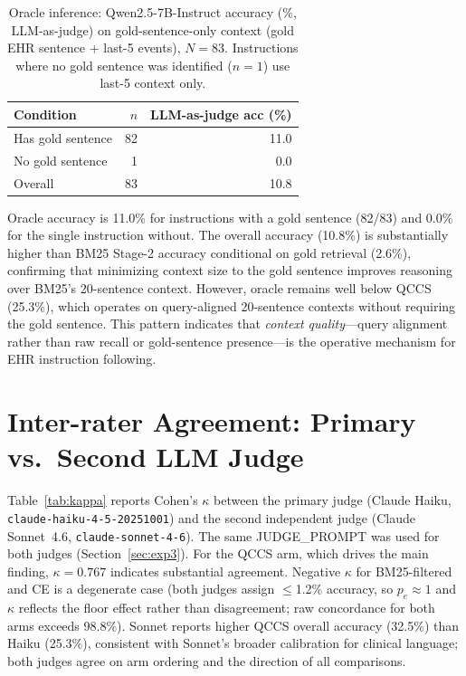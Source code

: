 \documentclass{article}
\begin{document}
\begin{table}[H]
\centering
\caption{Oracle inference: Qwen2.5-7B-Instruct accuracy (\%, LLM-as-judge)
  on gold-sentence-only context (gold EHR sentence + last-5 events), $N{=}83$.
  Instructions where no gold sentence was identified ($n{=}1$) use
  last-5 context only.}
\label{tab:oracle}
\small
\begin{tabular}{@{}lrr@{}}
\toprule
Condition & $n$ & LLM-as-judge acc (\%) \\
\midrule
Has gold sentence & 82 & 11.0 \\
No gold sentence  &  1 &  0.0 \\
Overall           & 83 & 10.8 \\
\bottomrule
\end{tabular}
\end{table}

Oracle accuracy is 11.0\% for instructions with a gold sentence (82/83) and
0.0\% for the single instruction without. The overall accuracy (10.8\%) is
substantially higher than BM25 Stage-2 accuracy conditional on gold retrieval
(2.6\%), confirming that minimizing context size to the gold sentence
improves reasoning over BM25's 20-sentence context. However, oracle remains
well below QCCS (25.3\%), which operates on query-aligned 20-sentence contexts
without requiring the gold sentence. This pattern indicates that \emph{context
quality}---query alignment rather than raw recall or gold-sentence
presence---is the operative mechanism for EHR instruction following.


\section{Inter-rater Agreement: Primary vs.\ Second LLM Judge}
\label{app:kappa}

Table~\ref{tab:kappa} reports Cohen's $\kappa$ between the primary judge
(Claude Haiku, \texttt{claude-haiku-4-5-20251001}) and the second independent
judge (Claude Sonnet~4.6, \texttt{claude-sonnet-4-6}). The same JUDGE\_PROMPT
was used for both judges (Section~\ref{sec:exp3}). For the QCCS arm, which
drives the main finding, $\kappa = 0.767$ indicates substantial agreement.
Negative $\kappa$ for BM25-filtered and CE is a degenerate case (both judges
assign $\leq$1.2\% accuracy, so $p_e \approx 1$ and $\kappa$ reflects the
floor effect rather than disagreement; raw concordance for both arms exceeds
98.8\%). Sonnet reports higher QCCS overall accuracy (32.5\%) than Haiku
(25.3\%), consistent with Sonnet's broader calibration for clinical language;
both judges agree on arm ordering and the direction of all comparisons.
\end{document}
